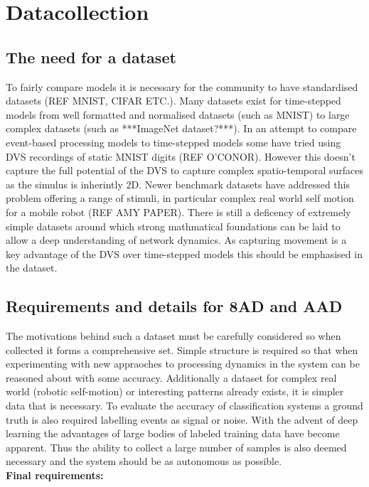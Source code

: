 \chapter{Datacollection}

\section{The need for a dataset}
To fairly compare models it is necessary for the community to have standardised datasets (REF MNIST, CIFAR ETC.). %
Many datasets exist for time-stepped models from well formatted and normalised datasets (such as MNIST) to large complex datasets (such as ***ImageNet dataset?***).
In an attempt to compare event-based processing models to time-stepped models some have tried using DVS recordings of static MNIST digits (REF O'CONOR). %
However this doesn't capture the full potential of the DVS to capture complex spatio-temporal surfaces as the simulus is inherintly 2D.
Newer benchmark datasets have addressed this problem offering a range of stimuli, in particular complex real world self motion for a mobile robot (REF AMY PAPER). %
There is still a deficency of extremely simple datasets around which strong mathmatical foundations can be laid to allow a deep understanding of network dynamics. 
As capturing movement is a key advantage of the DVS over time-stepped models this should be emphasised in the dataset. 

\section{Requirements and details for 8AD and AAD}
The motivations behind such a dataset must be carefully considered so when collected it forms a comprehensive set.
Simple structure is required so that when experimenting with new appraoches to processing dynamics in the system can be reasoned about with some accuracy.
Additionally a dataset for complex real world (robotic self-motion) or interesting patterns already exists, it is simpler data that is necessary.
To evaluate the accuracy of classification systems a ground truth is also required labelling events as signal or noise. 
With the advent of deep learning the advantages of large bodies of labeled training data have become apparent. 
Thus the ability to collect a large number of samples is also deemed necessary and the system should be as autonomous as possible. \\ 
\textbf{Final requirements:}

